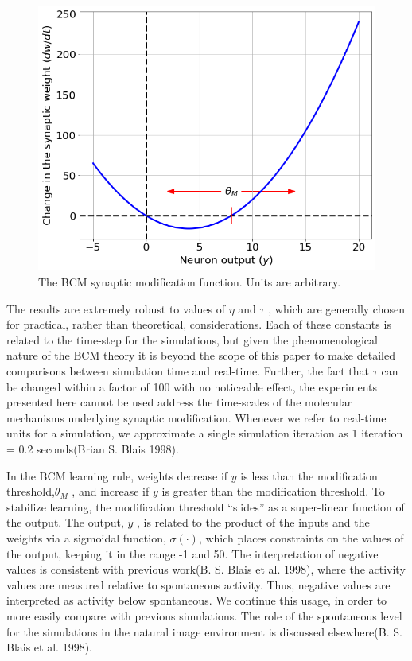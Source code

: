 \documentclass[
  letterpaper,
]{book}
\begin{document}
\begin{figure}[H]

{\centering \includegraphics{./Synaptic Modification_files/figure-pdf/fig-phi-output-1.png}

}

\caption{\label{fig-phi}The BCM synaptic modification function. Units
are arbitrary.}

\end{figure}

The results are extremely robust to values of \(\eta\) and \(\tau\) ,
which are generally chosen for practical, rather than theoretical,
considerations. Each of these constants is related to the time-step for
the simulations, but given the phenomenological nature of the BCM theory
it is beyond the scope of this paper to make detailed comparisons
between simulation time and real-time. Further, the fact that \(\tau\)
can be changed within a factor of 100 with no noticeable effect, the
experiments presented here cannot be used address the time-scales of the
molecular mechanisms underlying synaptic modification. Whenever we refer
to real-time units for a simulation, we approximate a single simulation
iteration as 1 iteration = 0.2 seconds(Brian S. Blais 1998).

In the BCM learning rule, weights decrease if \(y\) is less than the
modification threshold,\(\theta_M\) , and increase if \(y\) is greater
than the modification threshold. To stabilize learning, the modification
threshold ``slides'' as a super-linear function of the output. The
output, \(y\) , is related to the product of the inputs and the weights
via a sigmoidal function, \(\sigma(\cdot)\), which places constraints on
the values of the output, keeping it in the range -1 and 50. The
interpretation of negative values is consistent with previous work(B. S.
Blais et al. 1998), where the activity values are measured relative to
spontaneous activity. Thus, negative values are interpreted as activity
below spontaneous. We continue this usage, in order to more easily
compare with previous simulations. The role of the spontaneous level for
the simulations in the natural image environment is discussed
elsewhere(B. S. Blais et al. 1998).
\end{document}

